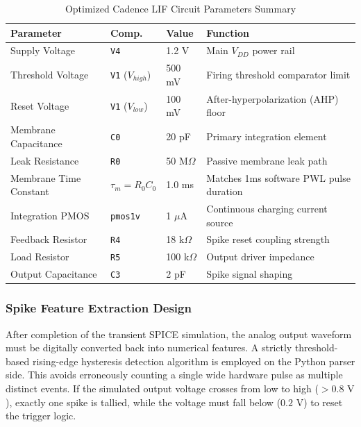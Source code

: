 \documentclass{ieeeaccess}
\begin{document}
\begin{table}[!t]
\centering
\caption{Optimized Cadence LIF Circuit Parameters Summary}
\label{tab:circuitparams}
\begin{tabular}{|p{}|p{}|p{}|p{}|}
\hline
\textbf{Parameter} & \textbf{Comp.} & \textbf{Value} & \textbf{Function} \\
\hline
Supply Voltage & \texttt{V4} & 1.2 V & Main $V_{DD}$ power rail \\
\hline
Threshold Voltage & \texttt{V1} ($V_{high}$) & 500 mV & Firing threshold comparator limit \\
\hline
Reset Voltage & \texttt{V1} ($V_{low}$) & 100 mV & After-hyperpolarization (AHP) floor \\
\hline
Membrane Capacitance & \texttt{C0} & 20 pF & Primary integration element \\
\hline
Leak Resistance & \texttt{R0} & 50 M$\Omega$ & Passive membrane leak path \\
\hline
Membrane Time Constant & $\tau_m = R_0C_0$ & 1.0 ms & Matches 1ms software PWL pulse duration \\
\hline
Integration PMOS & \texttt{pmos1v} & 1 $\mu$A & Continuous charging current source \\
\hline
Feedback Resistor & \texttt{R4} & 18 k$\Omega$ & Spike reset coupling strength \\
\hline
Load Resistor & \texttt{R5} & 100 k$\Omega$ & Output driver impedance \\
\hline
Output Capacitance & \texttt{C3} & 2 pF & Spike signal shaping \\
\hline
\end{tabular}
\end{table}

\subsubsection{Spike Feature Extraction Design}

After completion of the transient SPICE simulation, the analog output waveform must be digitally converted back into numerical features. A strictly threshold-based rising-edge hysteresis detection algorithm is employed on the Python parser side. This avoids erroneously counting a single wide hardware pulse as multiple distinct events. If the simulated output voltage crosses from low to high ($>0.8\text{ V}$), exactly one spike is tallied, while the voltage must fall below ($0.2\text{ V}$) to reset the trigger logic.
\end{document}
